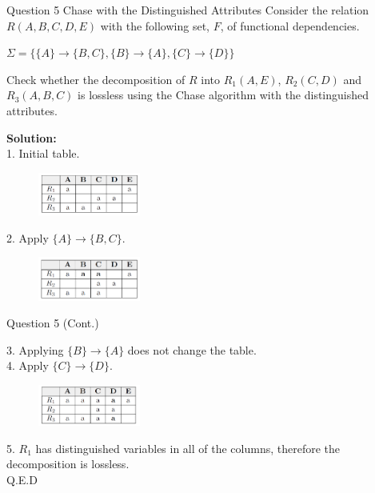 \begin{frame}[fragile]{Question 5 Chase with the Distinguished Attributes}
	Consider the relation $R(A,B,C,D,E)$ with the following set, $F$, of functional dependencies.\\ \vspace{5pt}
	
	$\Sigma=\{\{A\}\rightarrow\{B,C\}, \{B\}\rightarrow\{A\},\{C\}\rightarrow\{D\}\}$\\ \vspace{5pt}
	
	Check whether the decomposition of $R$ into $R_1(A,E)$, $R_2(C,D)$ and $R_3(A,B,C)$ is lossless using the Chase algorithm with the distinguished attributes.\\ \vspace{5pt}
	
	\textbf{Solution:}\\ \vspace{2pt}
	1. Initial table.\\
	\begin{figure}
		\includegraphics[width=0.3\textwidth, trim=0 0 0 0, clip]{4221-t5/images/5-1.png}
	\end{figure}
	
	2. Apply $\{A\} \rightarrow \{B,C\}$.\\
	\begin{figure}
		\includegraphics[width=0.3\textwidth, trim=0 0 0 0, clip]{4221-t5/images/5-2.png}
	\end{figure}
	
\end{frame}
\begin{frame}[fragile]{Question 5 (Cont.)}
	
	3. Applying $\{B\} \rightarrow \{A\}$ does not change the table.\\
	4. Apply $\{C\} \rightarrow \{D\}$.\\
	\begin{figure}
		\includegraphics[width=0.3\textwidth, trim=0 0 0 0, clip]{4221-t5/images/5-4.png}
	\end{figure}

	5. $R_1$ has distinguished variables in all of the columns, therefore the decomposition is lossless.\\
	\hfill Q.E.D
\end{frame}
	
